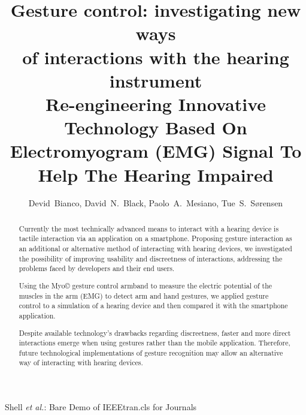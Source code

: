 \documentclass[journal]{./IEEEtran}
\begin{document}
%
\title{Gesture control: investigating new ways\\ of interactions with the hearing instrument \\ 
\large Re-engineering Innovative Technology Based On Electromyogram (EMG) Signal To Help The Hearing Impaired}
%
%
%

\author{Devid~Bianco,
        David~N.~Black,
        Paolo~A.~Mesiano,
        Tue~S.~S{\o}rensen}

%
{Shell \MakeLowercase{\textit{et al.}}: Bare Demo of IEEEtran.cls for Journals}




\maketitle
\begin{abstract}
Currently the most technically advanced means to interact with a hearing device is tactile interaction via an application on a smartphone. Proposing gesture interaction as an additional or alternative method of interacting with hearing devices, we investigated the possibility of improving usability and discreetness of interactions, addressing the problems faced by developers and their end users. 

Using the Myo© gesture control armband to measure the electric potential of the muscles in the arm (EMG) to detect arm and hand gestures, we applied gesture control to a simulation of a hearing device and then compared it with the smartphone application. 

Despite available technology’s drawbacks regarding discreetness,  faster and more direct interactions emerge when using gestures rather than the mobile application. Therefore, future technological implementations of gesture recognition may allow an alternative way of interacting with hearing devices.
\end{abstract}
\end{document}
